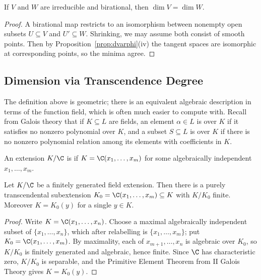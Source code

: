 \begin{corollary}
	If $V$ and $W$ are irreducible and birational, then $\dim V = \dim W$.
\end{corollary}

\begin{proof}
	A birational map restricts to an isomorphism between nonempty open subsets $U \subseteq V$ and $U' \subseteq W$. Shrinking, we may assume both consist of smooth points. Then by Proposition~\ref{prop:dvarphi}(iv) the tangent spaces are isomorphic at corresponding points, so the minima agree.
\end{proof}

\subsection{Dimension via Transcendence Degree}

The definition above is geometric; there is an equivalent algebraic description in terms of the function field, which is often much easier to compute with. Recall from Galois theory that if $K \subseteq L$ are fields, an element $\alpha \in L$ is  over $K$ if it satisfies no nonzero polynomial over $K$, and a subset $S \subseteq L$ is  over $K$ if there is no nonzero polynomial relation among its elements with coefficients in $K$.

\begin{definition}
	An extension $K/\C$ is  if $K = \C(x_1,\dots,x_m)$ for some algebraically independent $x_1,\dots,x_m$.
\end{definition}

\begin{proposition}\label{prop:transbasis}
	Let $K/\C$ be a finitely generated field extension. Then there is a purely transcendental subextension $K_0 = \C(x_1,\dots,x_m) \subseteq K$ with $K/K_0$ finite. Moreover $K = K_0(y)$ for a single $y \in K$.
\end{proposition}

\begin{proof}
	Write $K = \C(x_1,\dots,x_n)$. Choose a maximal algebraically independent subset of $\{x_1,\dots,x_n\}$, which after relabelling is $\{x_1,\dots,x_m\}$; put $K_0 = \C(x_1,\dots,x_m)$. By maximality, each of $x_{m+1},\dots,x_n$ is algebraic over $K_0$, so $K/K_0$ is finitely generated and algebraic, hence finite. Since $\C$ has characteristic zero, $K/K_0$ is separable, and the Primitive Element Theorem from II Galois Theory gives $K = K_0(y)$.
\end{proof}


